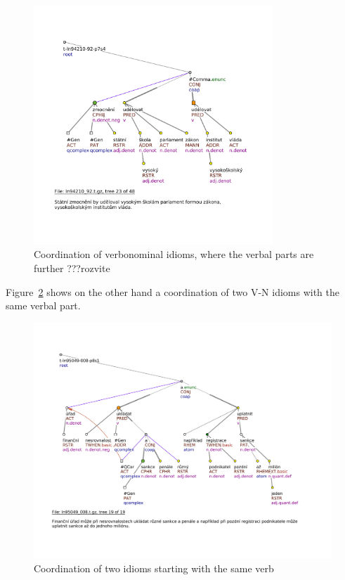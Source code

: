 \begin{figure}[h]
\includegraphics[width=0.8\textwidth]{images/vyhledavky/cphr-echild.pdf}
\caption{Coordination of verbonominal idioms, where the verbal parts are further ???rozvite }
\label{fig:cphr-echild}
\end{figure}

Figure~\ref{fig:cphr-echild2} shows on the other hand a coordination of two V-N idioms with the same verbal part.
\begin{figure}[h]
\includegraphics[width=\textwidth]{images/vyhledavky/cphr-ukladat-sankce-a-penale.pdf}
\caption{Coordination of two idioms starting with the same verb}
\label{fig:cphr-echild2}
\end{figure}


